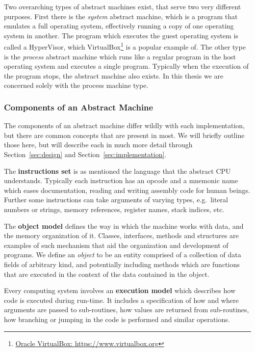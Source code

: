 Two overarching types of abstract machines exist, that serve two very different
purposes. First there is the \textit{system} abstract machine, which is a
program that emulates a full operating system, effectively running a copy of one
operating system in another. The program which executes the guest operating
system is called a HyperVisor, which VirtualBox\footnote{\url{Oracle VirtualBox:
    https://www.virtualbox.org}} is a popular example of. The other type is the
\textit{process} abstract machine which runs like a regular program in the host
operating system and executes a single program. Typically when the execution of
the program stops, the abstract machine also exists. In this thesis we are
concerned solely with the process machine type.

\subsubsection{Components of an Abstract Machine}

The components of an abstract machine differ wildly with each implementation,
but there are common concepts that are present in most. We will briefly outline
those here, but will describe each in much more detail through
Section~\ref{sec:design} and Section~\ref{sec:implementation}.

The \textbf{instructions set} is as mentioned the language that the abstract CPU
understands. Typically each instruction has an opcode and a mnemonic name which
eases documentation, reading and writing assembly code for human beings. Further
some instructions can take arguments of varying types, e.g.~literal numbers or
strings, memory references, register names, stack indices, etc.

The \textbf{object model} defines the way in which the machine works with data,
and the memory organization of it. Classes, interfaces, methods and structures
are examples of such mechanism that aid the organization and development of
programs. We define an \textit{object} to be an entity comprised of a collection
of data fields of arbitrary kind, and potentially including methods which are
functions that are executed in the context of the data contained in the object.

Every computing system involves an \textbf{execution model} which describes how
code is executed during run-time. It includes a specification of how and where
arguments are passed to sub-routines, how values are returned from sub-routines,
how branching or jumping in the code is performed and similar operations.


